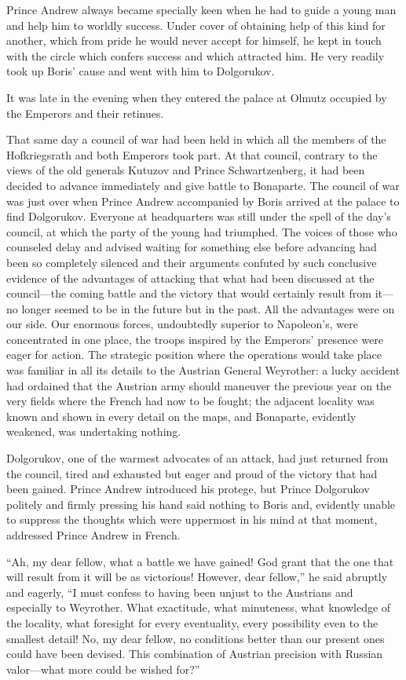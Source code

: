 Prince Andrew always became specially keen when he had to guide a
young man and help him to worldly success. Under cover of
obtaining help of this kind for another, which from pride he
would never accept for himself, he kept in touch with the circle
which confers success and which attracted him. He very readily
took up Boris' cause and went with him to Dolgorukov.

It was late in the evening when they entered the palace at Olmutz
occupied by the Emperors and their retinues.

That same day a council of war had been held in which all the
members of the Hofkriegsrath and both Emperors took part. At that
council, contrary to the views of the old generals Kutuzov and
Prince Schwartzenberg, it had been decided to advance immediately
and give battle to Bonaparte.  The council of war was just over
when Prince Andrew accompanied by Boris arrived at the palace to
find Dolgorukov. Everyone at headquarters was still under the
spell of the day's council, at which the party of the young had
triumphed. The voices of those who counseled delay and advised
waiting for something else before advancing had been so
completely silenced and their arguments confuted by such
conclusive evidence of the advantages of attacking that what had
been discussed at the council---the coming battle and the victory
that would certainly result from it---no longer seemed to be in
the future but in the past. All the advantages were on our
side. Our enormous forces, undoubtedly superior to Napoleon's,
were concentrated in one place, the troops inspired by the
Emperors' presence were eager for action. The strategic position
where the operations would take place was familiar in all its
details to the Austrian General Weyrother: a lucky accident had
ordained that the Austrian army should maneuver the previous year
on the very fields where the French had now to be fought; the
adjacent locality was known and shown in every detail on the
maps, and Bonaparte, evidently weakened, was undertaking nothing.

Dolgorukov, one of the warmest advocates of an attack, had just
returned from the council, tired and exhausted but eager and
proud of the victory that had been gained. Prince Andrew
introduced his protege, but Prince Dolgorukov politely and firmly
pressing his hand said nothing to Boris and, evidently unable to
suppress the thoughts which were uppermost in his mind at that
moment, addressed Prince Andrew in French.

``Ah, my dear fellow, what a battle we have gained! God grant
that the one that will result from it will be as victorious!
However, dear fellow,'' he said abruptly and eagerly, ``I must
confess to having been unjust to the Austrians and especially to
Weyrother. What exactitude, what minuteness, what knowledge of
the locality, what foresight for every eventuality, every
possibility even to the smallest detail! No, my dear fellow, no
conditions better than our present ones could have been
devised. This combination of Austrian precision with Russian
valor---what more could be wished for?''

